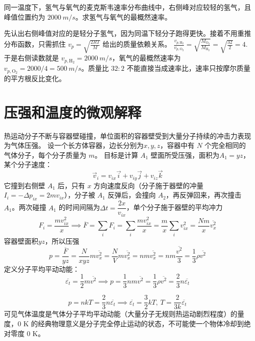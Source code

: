 \documentclass[lang=cn,11pt]{elegantbook}
\begin{document}
\begin{exercise}[从同温氢气和氧气的分布图怎样反推最概然速率]
同一温度下，氢气与氧气的麦克斯韦速率分布曲线中，右侧峰对应较轻的氢气，且峰值位置约为 \(\SI{2000}{m/s}\)。求氢气与氧气的最概然速率。
\end{exercise}

\begin{solution}
先认出右侧峰值对应的是轻分子氢气，因为同温下轻分子跑得更快。接着不用重推分布函数，只需抓住
 \(v_p=\sqrt{\frac{2RT}{M}}\) 
给出的质量依赖关系。
 \(\frac{v_{p,\mathrm{H_2}}}{v_{p,\mathrm{O_2}}} =\sqrt{\frac{M_{\mathrm{O_2}}}{M_{\mathrm{H_2}}}} =\sqrt{\frac{32}{2}}=4.\) 
于是右侧读数就是 \(v_{p,\mathrm{H_2}}=\SI{2000}{m/s}\)，氧气的最概然速率为 \(v_{p,\mathrm{O_2}}=2000/4=\SI{500}{m/s}\)。质量比 \(32:2\) 不能直接当成速率比，速率只按摩尔质量的平方根反比变化。
\end{solution}

\section{压强和温度的微观解释}

\begin{definition}[气体压强的微观来源]
热运动分子不断与容器壁碰撞，单位面积的容器壁受到大量分子持续的冲击力表现为气体压强。
设一个长方体容器，边长分别为$x,y,z$，容器中有 \(N\) 个完全相同的气体分子，每个分子质量为 \(m\)。
目标是计算 \(A_1\) 壁面所受压强，面积为$A_1=yz$，某个分子速度：
\[
\vec v_i=v_{ix}\vec i+v_{iy}\vec j+v_{iz}\vec k
\]它撞到右侧壁 \(A_1\) 后，只有 \(x\) 方向速度反向（分子施于器壁的冲量$I_i=-\Delta p_{ix}=2mv_{ix}$），分子被 \(A_1\) 反弹后，会撞向 \(A_2\)，再反弹回来，再次撞击 \(A_1\)。两次碰撞 \(A_1\) 的时间间隔为$\Delta t=\dfrac{2x}{v_{ix}}$，单个分子施于器壁的平均冲力\[F_i=\frac{mv_{ix}^2}{x}\implies\overline F=\sum_iF_i=\sum_i\frac{mv_{ix}^2}{x}=\frac{m}{x}\sum_i v_{ix}^2=\frac{Nm}{x}\overline{v_x^2}\]容器壁面积$yz$，所以压强\[p=\frac{\overline F}{yz}=\frac{N}{xyz}m\overline{v_x^2}=\frac{N}{V}m\overline{v_x^2}=nm\overline{v_x^2}=nm\frac{\overline{v^2}}{3}=\frac13\rho \overline{v^2}\]定义分子平均平动动能：\[\overline{\varepsilon_t}=\frac12m\overline{v^2}\implies \boxed{p=\frac{1}{3}nm\overline{v^2}=\frac13\rho\overline{v^2}=\frac23n\overline{\varepsilon_t}}\]
\end{definition}

\begin{definition}[气体温度的统计意义]
\[p=nkT=\frac23n\overline{\varepsilon_t}\implies\overline{\varepsilon_t}=\frac32kT,~T=\frac{2}{3k}\overline{\varepsilon_t}\]可见气体温度是气体分子平均平动动能（大量分子无规则热运动剧烈程度）的量度，\(0\text{ K}\) 的经典物理意义是分子完全停止运动的状态，不可能使一个物体冷却到绝对零度 \(0\text{ K}\)。
\end{definition}
\end{document}
